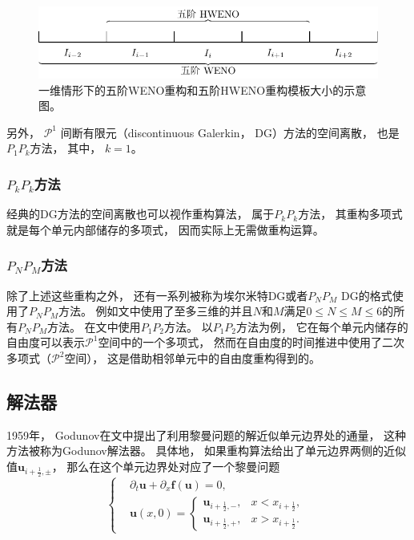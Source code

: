 \begin{figure}[htbp]
  \centering
  \includegraphics{fig/tikz/HWENO.pdf}
  \caption{一维情形下的五阶WENO重构和五阶HWENO重构模板大小的示意图。
  }
  \label{fig:HWENO}
\end{figure}

另外，
$\mathcal{P}^1$ 间断有限元（discontinuous Galerkin，
DG）方法的空间离散，
也是$P_1P_k$方法，
其中，
$k=1$。

\subsubsection{$P_kP_k$方法}

经典的DG方法的空间离散也可以视作重构算法，
属于$P_kP_k$方法，
其重构多项式就是每个单元内部储存的多项式，
因而实际上无需做重构运算。

\subsubsection{$P_NP_M$方法}

除了上述这些重构之外，
还有一系列被称为埃尔米特DG或者$P_NP_M$ DG的格式使用了$P_NP_M$方法。
例如文\cite{PNPM}中使用了至多三维的并且$N$和$M$满足$0\le N \le M\le 6$的所有$P_NP_M$方法。
在文\cite{luo2012hermite,xia2014implicit}中使用$P_1P_2$方法。
以$P_1P_2$方法为例，
它在每个单元内储存的自由度可以表示$\mathcal{P}^1$空间中的一个多项式，
然而在自由度的时间推进中使用了二次多项式（$\mathcal{P}^2$空间），
这是借助相邻单元中的自由度重构得到的。

\subsection{解法器}

1959年，
Godunov在文\cite{godunov}中提出了利用黎曼问题的解近似单元边界处的通量，
这种方法被称为Godunov解法器。
具体地，
如果重构算法给出了单元边界两侧的近似值${\bm u}_{i+\frac{1}{2},\pm}$，
那么在这个单元边界处对应了一个黎曼问题
\begin{equation}
  \label{eq:RP}
  \left\{
  \begin{aligned}
     & {\partial_{t}}{\bm{u}} + {\partial_{x}}{\bm{f}}({\bm{u}}) = 0, \\
     & {\bm{u}}(x,0) =
    \begin{cases}
      {\bm u}_{i+\frac{1}{2},-}, & x<x_{i+\frac{1}{2}},  \\
      {\bm u}_{i+\frac{1}{2},+}, & x>x_{i+\frac{1}{2}}.
    \end{cases}
  \end{aligned}
  \right.
\end{equation}

